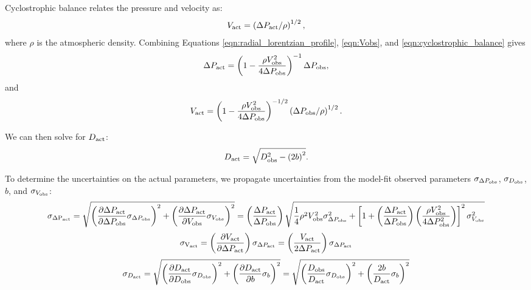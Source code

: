 \documentclass[linenumbers,trackchanges]{aastex63}
\begin{document}
Cyclostrophic balance relates the pressure and velocity \citep{2020Icar..33813523J} as:
\begin{equation}
    V_{\rm act} = \left( \Delta P_{\rm act}/\rho \right)^{1/2},\label{eqn:cyclostrophic_balance}
\end{equation}
where $\rho$ is the atmospheric density. Combining Equations \ref{eqn:radial_lorentzian_profile}, \ref{eqn:Vobs}, and \ref{eqn:cyclostrophic_balance} gives
\begin{equation}
    \Delta P_{\rm act} = \left( 1 - \frac{\rho V_{\rm obs}^2}{4 \Delta P_{\rm obs}} \right)^{-1} \Delta P_{\rm obs},\label{eqn:solution_for_Pact}
\end{equation}
and
\begin{equation}
    V_{\rm act} = \left( 1 - \frac{\rho V_{\rm obs}^2}{4 \Delta P_{\rm obs}} \right)^{-1/2} \left( \Delta P_{\rm obs}/\rho \right)^{1/2}.\label{eqn:solution_for_Vact}
\end{equation}

We can then solve for $D_{\rm act}$:
\begin{equation}
    D_{\rm act} = \sqrt{ D_{\rm obs}^2 - \left( 2 b\right)^2 }.\label{eqn:actual_diameter}
\end{equation}

To determine the uncertainties on the actual parameters, we propagate uncertainties from the model-fit observed parameters $\sigma_{\Delta P_{\rm obs}}$, $\sigma_{D_{\rm obs}}$, $b$, and $\sigma_{V_{\rm obs}}$:
\begin{equation}
    \sigma_{\rm \Delta P_{\rm act}} = \sqrt{ \left( \frac{\partial \Delta P_{\rm act}}{\partial \Delta P_{\rm obs}} \sigma_{\Delta P_{\rm obs}} \right)^2 + \left( \frac{\partial \Delta P_{\rm act}}{\partial V_{\rm obs}} \sigma_{V_{\rm obs}} \right)^2 } = \left( \frac{\Delta P_{\rm act}}{\Delta P_{\rm obs}} \right) \sqrt{ \frac{1}{4} \rho^2 V_{\rm obs}^2 \sigma_{\Delta P_{\rm obs}}^2 + \left[ 1 + \left( \frac{\Delta P_{\rm act}}{\Delta P_{\rm obs}} \right) \left( \frac{\rho V_{\rm obs}^2}{4 \Delta P_{\rm obs}^2} \right) \right]^2 \sigma_{V_{\rm obs}}^2 }
\end{equation}
\begin{equation}
    \sigma_{\rm V_{\rm act}} = \left( \frac{\partial V_{\rm act}}{\partial \Delta P_{\rm act}} \right) \sigma_{\Delta P_{\rm act}} = \left( \frac{V_{\rm act}}{2\Delta P_{\rm act}} \right) \sigma_{\Delta P_{\rm act}}
\end{equation}
\begin{equation}
    \sigma_{D_{\rm act}} = \sqrt{ \left( \frac{\partial D_{\rm act}}{\partial D_{\rm obs}} \sigma_{D_{\rm obs}} \right)^2 + \left( \frac{\partial D_{\rm act}}{\partial b} \sigma_{b}\right)^2 } = \sqrt{ \left( \frac{D_{\rm obs}}{D_{\rm act}} \sigma_{D_{\rm obs}}\right)^2 + \left( \frac{2b}{D_{\rm act}} \sigma_{b} \right)^2 }
\end{equation}
\end{document}

